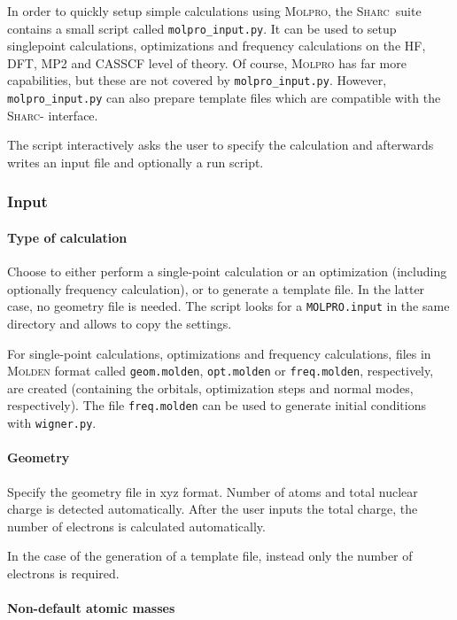 \documentclass[a4paper,11pt,DIV=15,openany,twoside=false]{scrbook}
\newcommand{\sharc}{\textsc{Sharc}}
\newcommand{\ttt}[1]{\texttt{#1}}
\begin{document}
In order to quickly setup simple calculations using \textsc{Molpro}, the \sharc\ suite contains a small script called \ttt{molpro\_input.py}. It can be used to setup singlepoint calculations, optimizations and frequency calculations on the HF, DFT, MP2 and CASSCF level of theory. Of course, \textsc{Molpro} has far more capabilities, but these are not covered by \ttt{molpro\_input.py}. However, \ttt{molpro\_input.py} can also prepare template files which are compatible with the \sharc- interface.

The script interactively asks the user to specify the calculation and afterwards writes an input file and optionally a run script.

\subsubsection{Input}

\paragraph{Type of calculation}

Choose to either perform a single-point calculation or an optimization (including optionally frequency calculation), or to generate a template file. In the latter case, no geometry file is needed. The script looks for a \ttt{MOLPRO.input} in the same directory and allows to copy the settings. 

For single-point calculations, optimizations and frequency calculations, files in \textsc{Molden} format called \ttt{geom.molden}, \ttt{opt.molden} or \ttt{freq.molden}, respectively, are created (containing the orbitals, optimization steps and normal modes, respectively). The file \ttt{freq.molden} can be used to generate initial conditions with \ttt{wigner.py}.

\paragraph{Geometry}

Specify the geometry file in xyz format. Number of atoms and total nuclear charge is detected automatically. After the user inputs the total charge, the number of electrons is calculated automatically.

In the case of the generation of a template file, instead only the number of electrons is required.

\paragraph{Non-default atomic masses}
\end{document}
